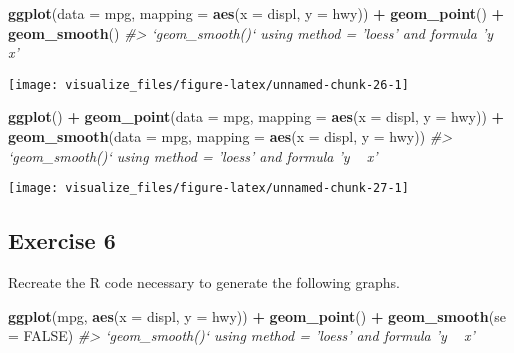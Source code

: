 \documentclass[]{book}
\newenvironment{Shaded}{\begin{snugshade}}{\end{snugshade}}
\newcommand{\CommentTok}[1]{\textcolor[rgb]{0.56,0.35,0.01}{\textit{#1}}}
\newcommand{\DataTypeTok}[1]{\textcolor[rgb]{0.13,0.29,0.53}{#1}}
\newcommand{\KeywordTok}[1]{\textcolor[rgb]{0.13,0.29,0.53}{\textbf{#1}}}
\newcommand{\NormalTok}[1]{#1}
\newcommand{\OperatorTok}[1]{\textcolor[rgb]{0.81,0.36,0.00}{\textbf{#1}}}
\newcommand{\OtherTok}[1]{\textcolor[rgb]{0.56,0.35,0.01}{#1}}
\newcommand{\StringTok}[1]{\textcolor[rgb]{0.31,0.60,0.02}{#1}}
\theoremstyle{plain}
\theoremstyle{remark}
\theoremstyle{definition}
\theoremstyle{definition}
\theoremstyle{definition}
\theoremstyle{remark}
\begin{document}
\begin{Shaded}
\begin{Highlighting}[]
\KeywordTok{ggplot}\NormalTok{(}\DataTypeTok{data =}\NormalTok{ mpg, }\DataTypeTok{mapping =} \KeywordTok{aes}\NormalTok{(}\DataTypeTok{x =}\NormalTok{ displ, }\DataTypeTok{y =}\NormalTok{ hwy)) }\OperatorTok{+}
\StringTok{  }\KeywordTok{geom_point}\NormalTok{() }\OperatorTok{+}
\StringTok{  }\KeywordTok{geom_smooth}\NormalTok{()}
\CommentTok{#> `geom_smooth()` using method = 'loess' and formula 'y ~ x'}
\end{Highlighting}
\end{Shaded}

\begin{center}\texttt{[image: visualize\_files/figure-latex/unnamed-chunk-26-1]} \end{center}

\begin{Shaded}
\begin{Highlighting}[]
\KeywordTok{ggplot}\NormalTok{() }\OperatorTok{+}
\StringTok{  }\KeywordTok{geom_point}\NormalTok{(}\DataTypeTok{data =}\NormalTok{ mpg, }\DataTypeTok{mapping =} \KeywordTok{aes}\NormalTok{(}\DataTypeTok{x =}\NormalTok{ displ, }\DataTypeTok{y =}\NormalTok{ hwy)) }\OperatorTok{+}
\StringTok{  }\KeywordTok{geom_smooth}\NormalTok{(}\DataTypeTok{data =}\NormalTok{ mpg, }\DataTypeTok{mapping =} \KeywordTok{aes}\NormalTok{(}\DataTypeTok{x =}\NormalTok{ displ, }\DataTypeTok{y =}\NormalTok{ hwy))}
\CommentTok{#> `geom_smooth()` using method = 'loess' and formula 'y ~ x'}
\end{Highlighting}
\end{Shaded}

\begin{center}\texttt{[image: visualize\_files/figure-latex/unnamed-chunk-27-1]} \end{center}

\hypertarget{exercise-6-1}{%
\subsection{Exercise 6}\label{exercise-6-1}}

Recreate the R code necessary to generate the following graphs.

\begin{Shaded}
\begin{Highlighting}[]
\KeywordTok{ggplot}\NormalTok{(mpg, }\KeywordTok{aes}\NormalTok{(}\DataTypeTok{x =}\NormalTok{ displ, }\DataTypeTok{y =}\NormalTok{ hwy)) }\OperatorTok{+}
\StringTok{  }\KeywordTok{geom_point}\NormalTok{() }\OperatorTok{+}
\StringTok{  }\KeywordTok{geom_smooth}\NormalTok{(}\DataTypeTok{se =} \OtherTok{FALSE}\NormalTok{)}
\CommentTok{#> `geom_smooth()` using method = 'loess' and formula 'y ~ x'}
\end{Highlighting}
\end{Shaded}
\end{document}
